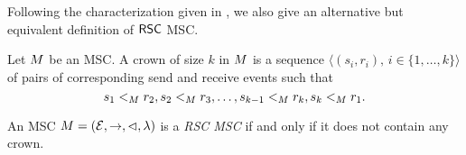 \documentclass{article}
\begin{document}
Following the characterization given in \cite[Theorem 4.4]{DBLP:journals/dc/Charron-BostMT96}, we also give an alternative but equivalent definition of $\mathsf{RSC}$ MSC.

\begin{definition}
	Let $M$ be an MSC. A crown of size $k$ in $M$ is a sequence $\langle(s_i,r_i),\, i \in \{1,\dots,k\}\rangle$ of pairs of corresponding send and receive events such that
	\[
		s_1 <_M r_2, s_2 <_M r_3, \dots, s_{k-1} <_M r_k, s_k <_M r_1.
	\]
\end{definition}

\begin{definition} \label{def:rsc_alt}
	An MSC $M = (\mathcal{E},\to,\lhd,\lambda)$ is a \emph{RSC MSC} if and only if it does not contain any crown.
\end{definition}

\medskip

\end{document}
